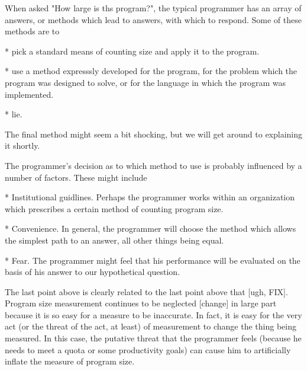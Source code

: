 
\begin{introduction}
When asked "How large is ths program?", the typical programmer has an array
of answers, or methods which lead to answers, with which to respond.  Some
of these methods are to

* pick a standard means of counting size and apply it to the program.  

* use a method expresssly developed for the program, for the problem which the
  program was designed to solve, or for the language in which the program
  was implemented.

* lie.

The final method might seem a bit shocking, but we will get around to
explaining it shortly.

The programmer's decision as to which method to use is probably influenced
by a number of factors.  These might include

* Institutional guidlines.  Perhaps the programmer works within an
  organization which prescribes a certain method of counting program size.

* Convenience.  In general, the programmer will choose the method which
  allows the simplest path to an answer, all other things being equal.

* Fear.  The programmer might feel that his performance will be evaluated
  on the basis of his answer to our hypothetical question.

The last point above is clearly related to the last point above that [ugh,
FIX].  Program size measurement continues to be neglected [change] in large
part because it is so easy for a measure to be inaccurate.  In fact, it is
easy for the very act (or the threat of the act, at least) of measurement
to change the thing being measured.  In this case, the putative threat that
the programmer feels (because he needs to meet a quota or some productivity
goals) can cause him to artificially inflate the measure of program size.


\end{introduction}
